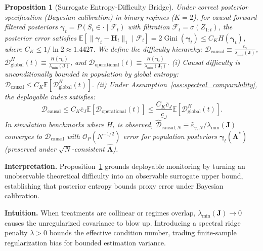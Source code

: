 \documentclass[twoside]{article}
\newtheorem{proposition}{Proposition}
\theoremstyle{definition}
\newcommand{\E}{\mathbb{E}}
\begin{document}
\begin{proposition}[Surrogate Entropy-Difficulty Bridge]
\label{prop:bridge}
Under correct posterior specification (Bayesian calibration) in binary regimes ($K=2$), for causal forward-filtered posteriors $\boldsymbol{\gamma}_t = P(S_t \in \cdot \mid \mathcal{F}_t)$ with filtration $\mathcal{F}_t = \sigma(Z_{1:t})$, the posterior error satisfies $\E[\|\boldsymbol{\gamma}_t - \boldsymbol{H}_t\|_1 \mid \mathcal{F}_t] = 2 \operatorname{Gini}(\boldsymbol{\gamma}_t) \le C_K H(\boldsymbol{\gamma}_t)$, where $C_K \le 1/\ln 2 \approx 1.4427$.
We define the difficulty hierarchy: $\mathcal{D}_{\mathrm{causal}} \equiv \frac{\varepsilon_\gamma}{\lambda_{\min}(\boldsymbol{J})}$, $\mathcal{D}_{\mathrm{global}}^H(t) \equiv \frac{H(\boldsymbol{\gamma}_t)}{\lambda_{\min}(\boldsymbol{J})}$, and $\mathcal{D}_{\mathrm{operational}}(t) \equiv \frac{H(\boldsymbol{\gamma}_t)}{\lambda_{\min}(\boldsymbol{J}_t)}$.
(i) Causal difficulty is unconditionally bounded in population by global entropy: $\mathcal{D}_{\mathrm{causal}} \le C_K \E\left[ \mathcal{D}_{\mathrm{global}}^H(t) \right]$.
(ii) Under Assumption~\ref{ass:spectral_comparability}, the deployable index satisfies:
\begin{equation}
\label{eq:bridge_bound}
    \mathcal{D}_{\mathrm{causal}} \le C_K \overline{c}_J \E[\mathcal{D}_{\mathrm{operational}}(t)] \le \frac{C_K \overline{c}_J}{\underline{c}_J} \E[\mathcal{D}_{\mathrm{global}}^H(t)].
\end{equation}
In simulation benchmarks where $H_t$ is observed, $\hat{\mathcal{D}}_{\mathrm{causal}, N} \equiv \hat{\varepsilon}_{\gamma, N} / \lambda_{\min}(\boldsymbol{J})$ converges to $\mathcal{D}_{\mathrm{causal}}$ with $\mathcal{O}_P(N^{-1/2})$ error for population posteriors $\boldsymbol{\gamma}_t(\boldsymbol{\Lambda}^*)$ (preserved under $\sqrt{N}$-consistent $\hat{\boldsymbol{\Lambda}}$).
\end{proposition}
\textbf{Interpretation.} Proposition~\ref{prop:bridge} grounds deployable monitoring by turning an unobservable theoretical difficulty into an observable surrogate upper bound, establishing that posterior entropy bounds proxy error under Bayesian calibration.

\textbf{Intuition.} When treatments are collinear or regimes overlap, $\lambda_{\min}(\boldsymbol{J}) \to 0$ causes the unregularized covariance to blow up. Introducing a spectral ridge penalty $\lambda > 0$ bounds the effective condition number, trading finite-sample regularization bias for bounded estimation variance.
\end{document}
